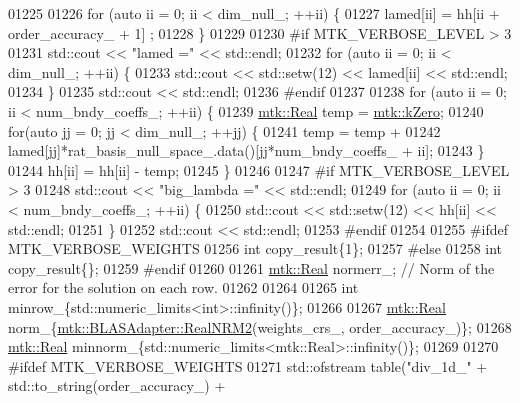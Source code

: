 \begin{DoxyCode}
{{01225 
01226     \textcolor{keywordflow}{for} (\textcolor{keyword}{auto} ii = 0; ii < dim\_null\_; ++ii) \{
01227       lamed[ii] = hh[ii + order\_accuracy\_ + 1] ;
01228     \}
01229 
01230 \textcolor{preprocessor}{    #if MTK\_VERBOSE\_LEVEL > 3}
01231     std::cout << \textcolor{stringliteral}{"lamed ="} << std::endl;
01232     \textcolor{keywordflow}{for} (\textcolor{keyword}{auto} ii = 0; ii < dim\_null\_; ++ii) \{
01233       std::cout << std::setw(12) << lamed[ii] << std::endl;
01234     \}
01235     std::cout << std::endl;
01236 \textcolor{preprocessor}{    #endif}
01237 
01238     \textcolor{keywordflow}{for} (\textcolor{keyword}{auto} ii = 0; ii < num\_bndy\_coeffs\_; ++ii) \{
01239       \hyperlink{group__c01-roots_gac080bbbf5cbb5502c9f00405f894857d}{mtk::Real} temp = \hyperlink{group__c01-roots_ga59a451a5fae30d59649bcda274fea271}{mtk::kZero};
01240       \textcolor{keywordflow}{for}(\textcolor{keyword}{auto} jj = 0; jj < dim\_null\_; ++jj) \{
01241         temp = temp +
01242           lamed[jj]*rat\_basis\_null\_space\_.data()[jj*num\_bndy\_coeffs\_ + ii];
01243       \}
01244       hh[ii] = hh[ii] - temp;
01245     \}
01246 
01247 \textcolor{preprocessor}{    #if MTK\_VERBOSE\_LEVEL > 3}
01248     std::cout << \textcolor{stringliteral}{"big\_lambda ="} << std::endl;
01249     \textcolor{keywordflow}{for} (\textcolor{keyword}{auto} ii = 0; ii < num\_bndy\_coeffs\_; ++ii) \{
01250       std::cout << std::setw(12) << hh[ii] << std::endl;
01251     \}
01252     std::cout << std::endl;
01253 \textcolor{preprocessor}{    #endif}
01254 
01255 \textcolor{preprocessor}{    #ifdef MTK\_VERBOSE\_WEIGHTS}
01256     \textcolor{keywordtype}{int} copy\_result\{1\};
01257 \textcolor{preprocessor}{    #else}
01258     \textcolor{keywordtype}{int} copy\_result\{\};
01259 \textcolor{preprocessor}{    #endif}
01260 
01261     \hyperlink{group__c01-roots_gac080bbbf5cbb5502c9f00405f894857d}{mtk::Real} normerr\_; \textcolor{comment}{// Norm of the error for the solution on each row.}
01262 
01264 
01265     \textcolor{keywordtype}{int} minrow\_\{std::numeric\_limits<int>::infinity()\};
01266 
01267     \hyperlink{group__c01-roots_gac080bbbf5cbb5502c9f00405f894857d}{mtk::Real} norm\_\{\hyperlink{classmtk_1_1BLASAdapter_ab92440888b730863244c5d9479c11aca}{mtk::BLASAdapter::RealNRM2}(weights\_crs\_,
      order\_accuracy\_)\};
01268     \hyperlink{group__c01-roots_gac080bbbf5cbb5502c9f00405f894857d}{mtk::Real} minnorm\_\{std::numeric\_limits<mtk::Real>::infinity()\};
01269 
01270 \textcolor{preprocessor}{    #ifdef MTK\_VERBOSE\_WEIGHTS}
01271     std::ofstream table(\textcolor{stringliteral}{"div\_1d\_"} + std::to\_string(order\_accuracy\_) +
}}
\end{DoxyCode}

